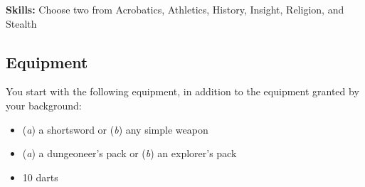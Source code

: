 \textbf{Skills:} Choose two from Acrobatics, Athletics, History, Insight, Religion, and Stealth

\subsection{Equipment}

You start with the following equipment, in addition to the equipment granted by your background:
\begin{itemize}
\item (\textit{a}) a shortsword or (\textit{b}) any simple weapon
\item (\textit{a}) a dungeoneer's pack or (\textit{b}) an explorer's pack
\item 10 darts
\end{itemize}

